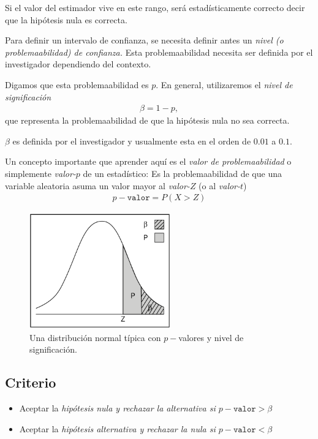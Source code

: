 Si el valor del estimador vive en este rango, será estadísticamente correcto decir que la hipótesis nula es correcta.


Para definir un intervalo de confianza, se necesita definir antes un \emph{nivel (o problemaabilidad) de confianza.}  Esta problemaabilidad necesita ser definida por el investigador dependiendo del contexto.


Digamos que esta problemaabilidad es $p$. En general, utilizaremos el \emph{nivel de significación}
\begin{align}
	\beta = 1-p,
\end{align}
que representa la problemaabilidad de que la hipótesis nula no sea correcta. 

$\beta$ es definida por el investigador y usualmente esta en el orden de $0.01$ a $0.1$.



Un concepto importante que aprender aquí es el \emph{valor de problemaabilidad} o simplemente \emph{valor-}$p$ de un estadístico:  Es la problemaabilidad de que una variable aleatoria asuma un valor mayor al \emph{valor-}$Z$ (o al \emph{valor-}$t$)
\begin{align}
	p-\texttt{valor}=P\left( X>Z \right)
\end{align}



\begin{figure}
	\centering
	\includegraphics[height=5cm,keepaspectratio=true]{./images/kum0402.png}
	\caption{Una distribución normal típica con $p-$valores y nivel de significación.}
	\label{fig:0402}
\end{figure}


\subsection{Criterio}
\begin{itemize}
	\item Aceptar la \emph{hipótesis nula y rechazar la alternativa si $p-\texttt{valor}>\beta$}
	\item Aceptar la \emph{hipótesis alternativa y rechazar la nula si $p-\texttt{valor}<\beta$}
\end{itemize}



